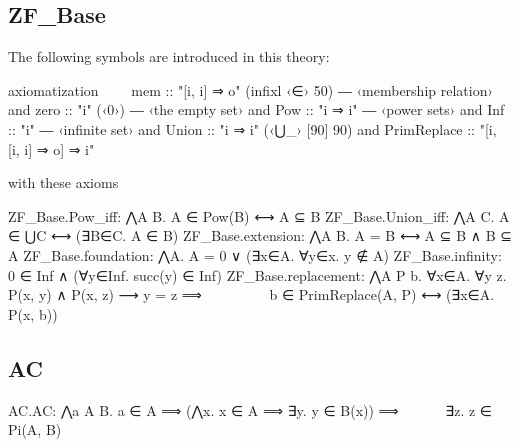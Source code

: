 \subsection{ZF\_Base}
The following symbols are introduced in this theory:
\begin{isabelle}
axiomatization\isanewline
\ \ \ \      mem :: "[i, i] ⇒ o"  (infixl ‹∈› 50)  ― ‹membership relation›\isanewline
  and zero :: "i"  (‹0›)  ― ‹the empty set›\isanewline
  and Pow :: "i ⇒ i"  ― ‹power sets›\isanewline
  and Inf :: "i"  ― ‹infinite set›\isanewline
  and Union :: "i ⇒ i"  (‹⋃\_› [90] 90)\isanewline
  and PrimReplace :: "[i, [i, i] ⇒ o] ⇒ i"
\end{isabelle}
\noindent with these axioms
\begin{isabelle}
ZF\_Base.Pow\_iff: ⋀A B. A ∈ Pow(B) ⟷ A ⊆ B\isanewline
ZF\_Base.Union\_iff: ⋀A C. A ∈ ⋃C ⟷ (∃B∈C. A ∈ B)\isanewline
ZF\_Base.extension: ⋀A B. A = B ⟷ A ⊆ B ∧ B ⊆ A\isanewline
ZF\_Base.foundation: ⋀A. A = 0 ∨ (∃x∈A. ∀y∈x. y ∉ A)\isanewline
ZF\_Base.infinity: 0 ∈ Inf ∧ (∀y∈Inf. succ(y) ∈ Inf)\isanewline
ZF\_Base.replacement: ⋀A P b. ∀x∈A. ∀y z. P(x, y) ∧ P(x, z) ⟶ y = z ⟹ \isanewline
\ \ \ \ \ \ \ \ \ b ∈ PrimReplace(A, P) ⟷ (∃x∈A. P(x, b))
\end{isabelle}

\subsection{AC}
\begin{isabelle}
AC.AC: ⋀a A B. a ∈ A ⟹ (⋀x. x ∈ A ⟹ ∃y. y ∈ B(x)) ⟹\isanewline
  \ \ \ \ \ \ ∃z. z ∈ Pi(A, B)
\end{isabelle}
